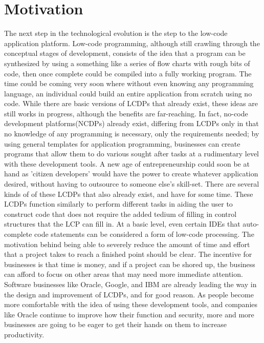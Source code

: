 \documentclass[conference]{IEEEtran}
\begin{document}
\section{Motivation}
The next step in the technological evolution is the step to the low-code application platform.  Low-code programming, although still crawling through the conceptual stages of development, consists of the idea that a program can be synthesized by using a something like a series of flow charts with rough bits of code, then once complete could be compiled into a fully working program. The time could be coming very soon where without even knowing any programming language, an individual could build an entire application from scratch using no code.  While there are basic versions of LCDPs that already exist, these ideas are still works in progress, although the benefits are far-reaching.  In fact, no-code development platforms(NCDPs) already exist, differing from LCDPs only in that no knowledge of any programming is necessary, only the requirements needed; by using general templates for application programming, businesses can create programs that allow them to do various sought after tasks at a rudimentary level with these development tools. A new age of entrepreneurship could soon be at hand as 'citizen developers'\cite{LCP} would have the power to create whatever application desired, without having to outsource to someone else's skill-set.  There are several kinds of of these LCDPs that also already exist, and have for some time.  These LCDPs function similarly to perform different tasks in aiding the user to construct code that does not require the added tedium of filling in control structures that the LCP can fill in.  At a basic level, even certain IDEs that auto-complete code statements can be considered a form of low-code processing.  The motivation behind being able to severely reduce the amount of time and effort that a project takes to reach a finished point should be clear.  The incentive for businesses is that time is money, and if a project can be shored up, the business can afford to focus on other areas that may need more immediate attention.  Software businesses like Oracle, Google, and IBM\cite{SDT} are already leading the way in the design and improvement of LCDPs, and for good reason.  As people become more comfortable with the idea of using these development tools, and companies like Oracle continue to improve how their function and security, more and more businesses are going to be eager to get their hands on them to increase productivity.
\end{document}

